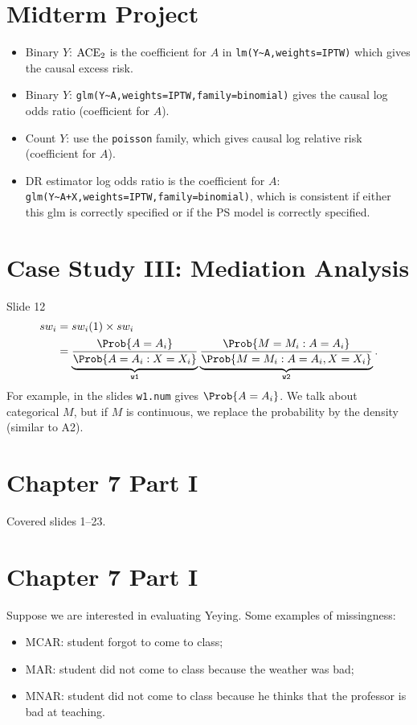 \section*{Midterm Project}
\begin{itemize}
    \item Binary $ Y $:
          $ \text{ACE}_2 $ is the coefficient for $ A $ in
          \texttt{lm(Y\~{}A,weights=IPTW)} which gives the causal excess risk.
    \item Binary $ Y $: \texttt{glm(Y\~{}A,weights=IPTW,family=binomial)} gives the causal log odds ratio (coefficient for $ A $).
    \item Count $ Y $: use the \texttt{poisson} family, which gives causal log relative risk (coefficient for $ A $).
    \item DR estimator log odds ratio is the coefficient for $ A $:
          \texttt{glm(Y\~{}A+X,weights=IPTW,family=binomial)}, which is consistent
          if either this glm is correctly specified or if the PS model is correctly specified.
\end{itemize}
\section*{Case Study III\@: Mediation Analysis}
\begin{Regular}{Slide 12}
    \begin{align*}
        sw_i
         & =sw_i(1)\times sw_i                                                       \\
         & =\underbrace{\frac{\Prob{A=A_i}}{\Prob{A=A_i\given X=X_i}}}_{\texttt{w1}}
        \underbrace{\frac{\Prob{M=M_i\given A=A_i}}{\Prob{M=M_i\given A=A_i,X=X_i}}}_{\texttt{w2}}.
    \end{align*}
    For example, in the slides \texttt{w1.num} gives $ \Prob{A=A_i} $. We talk about
    categorical $ M $, but if $ M $ is continuous, we replace the probability by the
    density (similar to A2).
\end{Regular}
\section*{Chapter 7 Part I}
Covered slides 1--23.

\section*{Chapter 7 Part I}
Suppose we are interested in evaluating Yeying. Some examples of missingness:
\begin{itemize}
    \item MCAR\@: student forgot to come to class;
    \item MAR\@: student did not come to class because the weather was bad;
    \item MNAR\@: student did not come to class because he thinks
          that the professor is bad at teaching.
\end{itemize}
